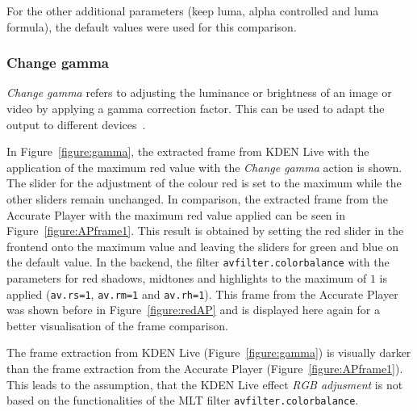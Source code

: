 \documentclass[../MasterThesis.tex]{subfiles}
\begin{document}
For the other additional parameters (keep luma, alpha controlled and luma formula), the default values were used for this comparison.












\subsubsection*{Change gamma}

\textit{Change gamma} refers to adjusting the luminance or brightness of an image or video by applying a gamma correction factor. This can be used to adapt the output to different devices~\cite{gamma}.

In Figure~\ref{figure:gamma}, the extracted frame from KDEN Live with the application of the maximum red value with the \textit{Change gamma} action is shown. The slider for the adjustment of the colour red is set to the maximum while the other sliders remain unchanged.
In comparison, the extracted frame from the Accurate Player with the maximum red value applied can be seen in Figure~\ref{figure:APframe1}. This result is obtained by setting the red slider in the frontend onto the maximum value and leaving the sliders for green and blue on the default value. In the backend, the filter \texttt{avfilter.colorbalance} with the parameters for red shadows, midtones and highlights to the maximum of $1$ is applied (\texttt{av.rs=1}, \texttt{av.rm=1} and \texttt{av.rh=1}).
This frame from the Accurate Player was shown before in Figure~\ref{figure:redAP} and is displayed here again for a better visualisation of the frame comparison.

The frame extraction from KDEN Live (Figure~\ref{figure:gamma}) is visually darker than the frame extraction from the Accurate Player (Figure~\ref{figure:APframe1}). This leads to the assumption, that the KDEN Live effect \textit{RGB adjusment} is not based on the functionalities of the MLT filter \texttt{avfilter.colorbalance}.
\end{document}
